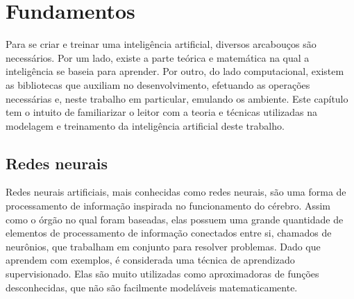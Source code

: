 
\chapter{Fundamentos}
\label{cap:fundamentos}

Para se criar e treinar uma inteligência artificial, diversos arcabouços são necessários.
Por um lado, existe a parte teórica e matemática na qual a inteligência se baseia para aprender. 
Por outro, do lado computacional, existem as bibliotecas que auxiliam no desenvolvimento, efetuando as operações necessárias e, neste trabalho em particular, emulando os ambiente.
Este capítulo tem o intuito de familiarizar o leitor com a teoria e técnicas utilizadas na modelagem e treinamento da inteligência artificial deste trabalho.


\section{Redes neurais}
\label{sec:nn}


Redes neurais artificiais, mais conhecidas como redes neurais, são uma forma de processamento de informação inspirada no funcionamento do cérebro.
Assim como o órgão no qual foram baseadas, elas possuem uma grande quantidade de elementos de processamento de informação conectados entre si, chamados de neurônios, que trabalham em conjunto para resolver problemas.
Dado que aprendem com exemplos, é considerada uma técnica de aprendizado supervisionado.
Elas são muito utilizadas como aproximadoras de funções desconhecidas, que não são facilmente modeláveis matematicamente.

